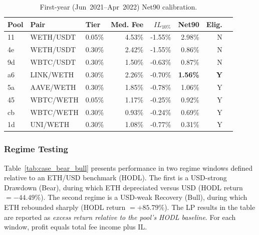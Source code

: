 \documentclass[journal]{IEEEtran}
\begin{document}
\begin{table}[b]
\centering
\scriptsize
\begin{tabular}{lllrrrrc}
\toprule
Pool & Pair & Tier & Med. Fee & $IL_{10\%}$ & \textbf{Net90} & Elig. \\
\midrule
11 & WETH/USDT & 0.05\% & 4.53\% & -1.55\% & 2.98\% & N \\
4e & WETH/USDT & 0.30\% & 2.42\% & -1.55\% & 0.86\% & N \\
9d & WBTC/USDT & 0.30\% & 1.50\% & -0.63\% & 0.87\% & N \\
\rowcolor{gray!15}
a6 & LINK/WETH & 0.30\% & 2.26\% & -0.70\% & \textbf{1.56\%} & \textbf{Y} \\
5a & AAVE/WETH & 0.30\% & 1.85\% & -0.78\% & 1.06\% & Y \\
45 & WBTC/WETH & 0.05\% & 1.17\% & -0.25\% & 0.92\% & Y \\
cb & WBTC/WETH & 0.30\% & 0.93\% & -0.24\% & 0.69\% & Y \\
1d & UNI/WETH & 0.30\% & 1.08\% & -0.77\% & 0.31\% & Y \\
\bottomrule
\end{tabular}
\caption{First-year (Jun~2021--Apr~2022) Net90 calibration.}
\label{tab:first_year_net90}
\end{table}

\subsubsection{Regime Testing}
Table~\ref{tab:case_bear_bull} presents performance in two regime windows defined relative to an ETH/USD benchmark (HODL). The first is a USD-strong Drawdown (Bear), during which ETH depreciated versus USD (HODL return $=-44.49\%$). The second regime is a USD-weak Recovery (Bull), during which ETH rebounded sharply (HODL return $=+85.79\%$). 
The LP results in the table are reported as \emph{excess return relative to the pool’s HODL baseline}. 
For each window, profit equals total fee income plus IL.
\end{document}
